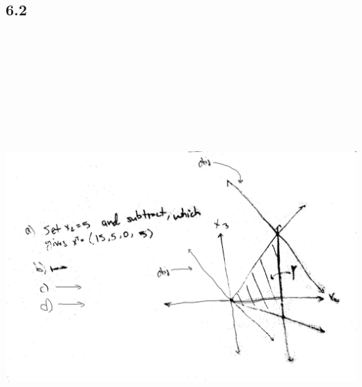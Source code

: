 \documentclass[a4paper,12pt]{article}
\begin{document}
\begin{center}
\section*{6.2}
\includegraphics[width=7in, height=7in, keepaspectratio=true]{image/sixtwo.jpg}

\end{center}
\end{document}
